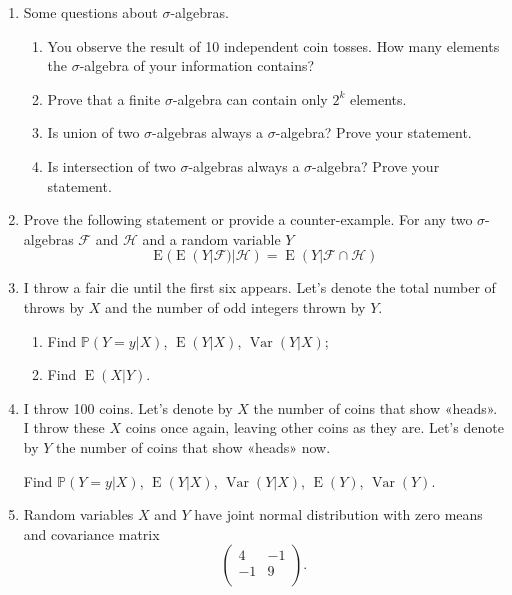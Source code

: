 \documentclass[12pt]{article}
\DeclareMathOperator{\Var}{Var}
\DeclareMathOperator{\E}{E}
\def \P{\mathbb{P}}
\begin{document}
\begin{enumerate}

\item Some questions about $\sigma$-algebras. 
\begin{enumerate}
  \item You observe the result of 10 independent coin tosses. How many elements the $\sigma$-algebra of your information contains?
  \item Prove that a finite $\sigma$-algebra can contain only $2^k$ elements.
  \item Is union of two $\sigma$-algebras always a $\sigma$-algebra? Prove your statement.
  \item Is intersection of two $\sigma$-algebras always a $\sigma$-algebra? Prove your statement.
\end{enumerate}

\item Prove the following statement or provide a counter-example.
For any two $\sigma$-algebras $\mathcal{F}$ and $\mathcal{H}$ and a random variable $Y$
\[
  \E(\E(Y|\mathcal F)|\mathcal H) = \E(Y|\mathcal F \cap \mathcal H)
\]

\item I throw a fair die until the first six appears. 
Let's denote the total number of throws by $X$ and the number of odd integers thrown by $Y$.

\begin{enumerate}
  \item Find $\P(Y=y|X)$, $\E(Y|X)$, $\Var(Y|X)$;
  \item Find $\E(X|Y)$.
\end{enumerate}

\item I throw 100 coins. Let's denote by $X$ the number of coins that show «heads».
I throw these $X$ coins once again, leaving other coins as they are. 
Let's denote by $Y$ the number of coins that show «heads» now.

Find $\P(Y=y|X)$, $\E(Y|X)$, $\Var(Y|X)$, $\E(Y)$, $\Var(Y)$.




\item Random variables $X$ and $Y$ have joint normal distribution with zero means and covariance matrix
\[
\begin{pmatrix}
4 & -1 \\
-1 & 9 \\
\end{pmatrix}.
\]


\end{enumerate}
\end{document}
